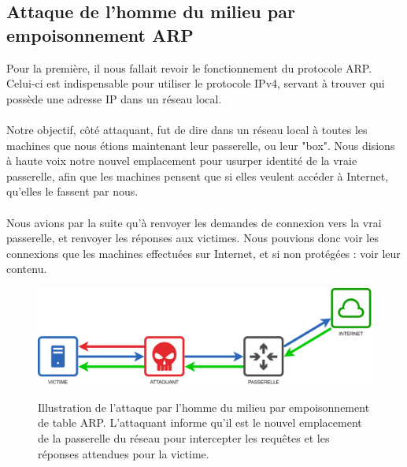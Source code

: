 \subsection{Attaque de l'homme du milieu par empoisonnement ARP}


Pour la première, il nous fallait revoir le fonctionnement du protocole ARP. Celui-ci est indispensable pour utiliser le protocole IPv4, servant à trouver qui possède une adresse IP dans un réseau local.
\\ \\
Notre objectif, côté attaquant, fut de dire dans un réseau local à toutes les machines que nous étions maintenant leur passerelle, ou leur "box". Nous disions à haute voix notre nouvel emplacement pour usurper identité de la vraie passerelle, afin que les machines pensent que si elles veulent accéder à Internet, qu'elles le fassent par nous.
\\ \\
Nous avions par la suite qu'à renvoyer les demandes de connexion vers la vrai passerelle, et renvoyer les réponses aux victimes. Nous pouvions donc voir les connexions que les machines effectuées sur Internet, et si non protégées : voir leur contenu.

\begin{figure}[H]
    \centering
    \captionsetup{justification=centering}
    \includegraphics[width=\textwidth - \textwidth / 20]{ressources/arp_poisoning_2.png}
    \figurename
    \caption{Illustration de l'attaque par l'homme du milieu par empoisonnement de table ARP. L'attaquant informe qu'il est le nouvel emplacement de la passerelle du réseau pour intercepter les requêtes et les réponses attendues pour la victime.}
    \label{fig:poste}
\end{figure}

